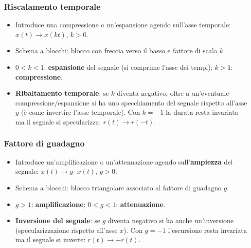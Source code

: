 \documentclass[12pt, a4paper]{article}
\begin{document}
\subsubsection{Riscalamento temporale}
\begin{itemize}
    \item Introduce una compressione o un'espansione agendo sull'asse temporale: $x(t) \to x(kt)$, $k>0$.
    \item Schema a blocchi: blocco con freccia verso il basso e fattore di scala $k$.
    \item $0<k<1$: \textbf{espansione} del segnale (si comprime l'asse dei tempi); $k>1$: \textbf{compressione}.
    \item \textbf{Ribaltamento temporale}: se $k$ diventa negativo, oltre a un'eventuale compressione/espansione si ha uno specchiamento del segnale rispetto all'asse $y$ (è come invertire l'asse temporale). Con $k=-1$ la durata resta invariata ma il segnale si specularizza: $r(t) \to r(-t)$.
\end{itemize}

\subsubsection{Fattore di guadagno}
\begin{itemize}
    \item Introduce un'amplificazione o un'attenuazione agendo sull'\textbf{ampiezza} del segnale: $x(t) \to g\cdot x(t)$, $g>0$.
    \item Schema a blocchi: blocco triangolare associato al fattore di guadagno $g$.
    \item $g>1$: \textbf{amplificazione}; $0<g<1$: \textbf{attenuazione}.
    \item \textbf{Inversione del segnale}: se $g$ diventa negativo si ha anche un'inversione (specularizzazione rispetto all'asse $x$). Con $g=-1$ l'escursione resta invariata ma il segnale si inverte: $r(t) \to -r(t)$.
\end{itemize}
\end{document}
